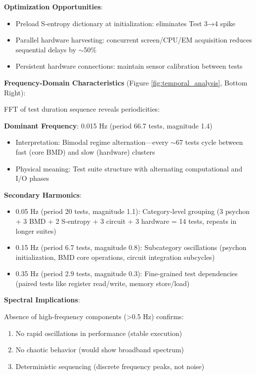 \documentclass[11pt,a4paper]{article}
\begin{document}
\textbf{Optimization Opportunities}:
\begin{itemize}
\item Preload S-entropy dictionary at initialization: eliminates Test 3→4 spike
\item Parallel hardware harvesting: concurrent screen/CPU/EM acquisition reduces sequential delays by $\sim$50\%
\item Persistent hardware connections: maintain sensor calibration between tests
\end{itemize}

\textbf{Frequency-Domain Characteristics} (Figure \ref{fig:temporal_analysis}, Bottom Right):

FFT of test duration sequence reveals periodicities:

\textbf{Dominant Frequency}: 0.015 Hz (period 66.7 tests, magnitude 1.4)
\begin{itemize}
\item Interpretation: Bimodal regime alternation—every $\sim$67 tests cycle between fast (core BMD) and slow (hardware) clusters
\item Physical meaning: Test suite structure with alternating computational and I/O phases
\end{itemize}

\textbf{Secondary Harmonics}:
\begin{itemize}
\item 0.05 Hz (period 20 tests, magnitude 1.1): Category-level grouping (3 psychon + 3 BMD + 2 S-entropy + 3 circuit + 3 hardware = 14 tests, repeats in longer suites)
\item 0.15 Hz (period 6.7 tests, magnitude 0.8): Subcategory oscillations (psychon initialization, BMD core operations, circuit integration subcycles)
\item 0.35 Hz (period 2.9 tests, magnitude 0.3): Fine-grained test dependencies (paired tests like register read/write, memory store/load)
\end{itemize}

\textbf{Spectral Implications}:

Absence of high-frequency components (>0.5 Hz) confirms:
\begin{enumerate}
\item No rapid oscillations in performance (stable execution)
\item No chaotic behavior (would show broadband spectrum)
\item Deterministic sequencing (discrete frequency peaks, not noise)
\end{enumerate}
\end{document}
